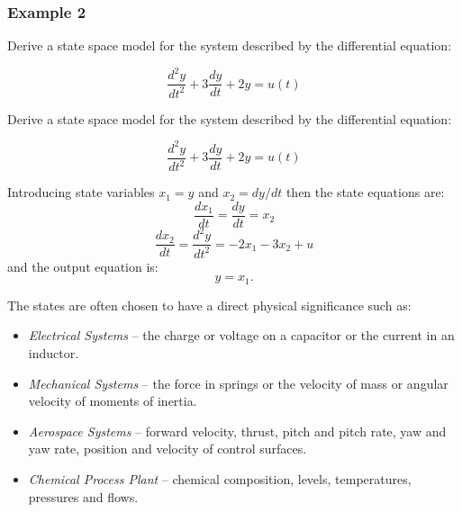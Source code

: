\subsubsection*{Example 2}

Derive a state space model for the system described by the differential equation:
 
$$\frac{d^2y}{dt^2}+3\frac{dy}{dt}+2y=u(t)$$
\ifslidesonly
\begin{slide}
	
	Derive a state space model for the system described by the differential equation:

	$$\frac{d^2y}{dt^2}+3\frac{dy}{dt}+2y=u(t)$$
\end{slide}
\fi
Introducing state variables $x_1=y$ and $x_2=dy/dt$ then the state equations are:
$$\frac{dx_1}{dt}=\frac{dy}{dt}=x_2$$
$$\frac{dx_2}{dt}=\frac{d^2y}{dt^2}=-2x_1 - 3x_2 + u$$
and the output equation is:
$$y=x_1.$$
 
\begin{slide}
The states are often chosen to have a direct physical significance such as:

\begin{itemize}
	\item \emph{Electrical Systems} -- the charge or voltage on a capacitor or the current in an inductor.
    \item \emph{Mechanical Systems} -- the force in springs or the velocity of mass or angular velocity of moments of inertia.
    \item \emph{Aerospace Systems} -- forward velocity, thrust, pitch and pitch rate, yaw and yaw rate, position and velocity of control surfaces.
    \item \emph{Chemical Process Plant} -- chemical composition, levels, temperatures, pressures and flows.
\end{itemize}
\end{slide}

